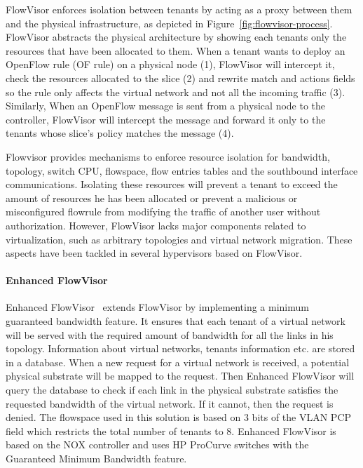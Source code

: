 FlowVisor enforces isolation between tenants by acting as a proxy between them and the physical infrastructure, as depicted in Figure~\ref{fig:flowvisor-process}.
FlowVisor abstracts the physical architecture by showing each tenants only the resources that have been allocated to them.
When a tenant wants to deploy an OpenFlow rule (OF rule) on a physical node (1), FlowVisor will intercept it, check the resources allocated to the slice (2) and rewrite match and actions fields so the rule only affects the virtual network and not all the incoming traffic (3).
Similarly, When an OpenFlow message is sent from a physical node to the controller, FlowVisor will intercept the message and forward it only to the tenants whose slice's policy matches the message (4).

Flowvisor provides mechanisms to enforce resource isolation for bandwidth, topology, switch CPU, flowspace, flow entries tables and the southbound interface communications. 
Isolating these resources will prevent a tenant to exceed the amount of resources he has been allocated or prevent a malicious or misconfigured flowrule from modifying the traffic of another user without authorization.
However, FlowVisor lacks major components related to virtualization, such as arbitrary topologies and virtual network migration.
These aspects have been tackled in several hypervisors based on FlowVisor.

\paragraph{Enhanced FlowVisor}
Enhanced FlowVisor~\cite{EnhancedFV-Min2012} extends FlowVisor by implementing a minimum guaranteed bandwidth feature. It ensures that each tenant of a virtual network will be served with the required amount of bandwidth for all the links in his topology. Information about virtual networks, tenants information etc. are stored in a database. When a new request for a virtual network is received, a potential physical substrate will be mapped to the request. Then Enhanced FlowVisor will query the database to check if each link in the physical substrate satisfies the requested bandwidth of the virtual network. If it cannot, then the request is denied. 
The flowspace used in this solution is based on 3 bits of the VLAN PCP field which restricts the total number of tenants to 8.
Enhanced FlowVisor is based on the NOX controller and uses HP ProCurve switches with the Guaranteed Minimum Bandwidth feature.

